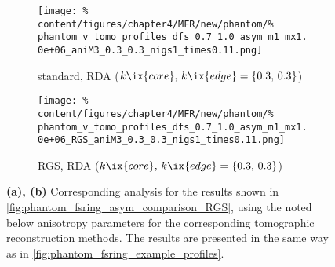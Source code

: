         \begin{figure}[t]%
            \centering%
            \begin{subfigure}{\textwidth}%
                \centering%
                \texttt{[image: \%
                    content/figures/chapter4/MFR/new/phantom/\%
                    phantom\_v\_tomo\_profiles\_dfs\_0.7\_1.0\_asym\_m1\_mx1.0e+06\_aniM3\_0.3\_0.3\_nigs1\_times0.11.png]}%
                \caption{standard, RDA ($k\ix{core},\,k\ix{edge}=\left\{0.3,\,0.3\right\}$)}%
            \end{subfigure}%
            \newline%
            \begin{subfigure}{\textwidth}%
                \centering%
                \texttt{[image: \%
                    content/figures/chapter4/MFR/new/phantom/\%
                    phantom\_v\_tomo\_profiles\_dfs\_0.7\_1.0\_asym\_m1\_mx1.0e+06\_RGS\_aniM3\_0.3\_0.3\_nigs1\_times0.11.png]}%
                \caption{RGS, RDA ($k\ix{core},\,k\ix{edge}=\left\{0.3,\,0.3\right\}$)}%
            \end{subfigure}%
            \caption{\textbf{(a), (b)} Corresponding analysis for the results shown in \cref{fig:phantom_fsring_asym_comparison_RGS}, using the noted below anisotropy parameters for the corresponding tomographic reconstruction methods. The results are presented in the same way as in \cref{fig:phantom_fsring_example_profiles}.}\label{fig:phantom_fsring_asym_comparison_RGS_profiles}%
        \end{figure}%
%
